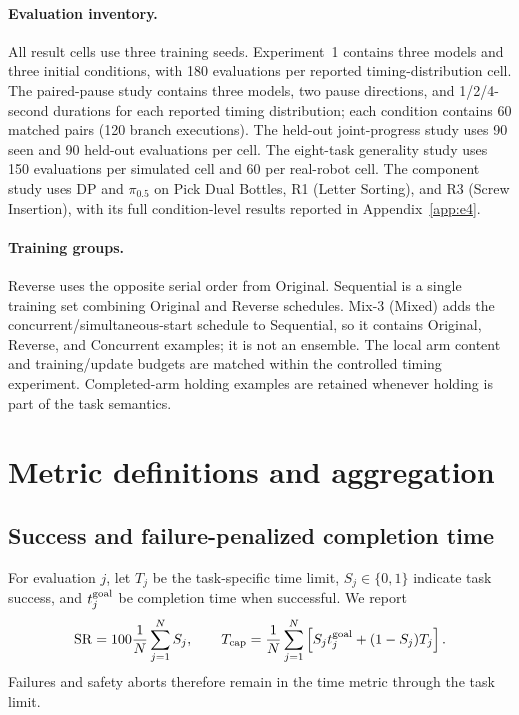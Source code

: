 \paragraph{Evaluation inventory.}
All result cells use three training seeds. Experiment~1 contains three models and three initial conditions, with 180 evaluations per reported timing-distribution cell. The paired-pause study contains three models, two pause directions, and 1/2/4-second durations for each reported timing distribution; each condition contains 60 matched pairs (120 branch executions). The held-out joint-progress study uses 90 seen and 90 held-out evaluations per cell. The eight-task generality study uses 150 evaluations per simulated cell and 60 per real-robot cell. The component study uses DP and $\pi_{0.5}$ on Pick Dual Bottles, R1 (Letter Sorting), and R3 (Screw Insertion), with its full condition-level results reported in Appendix~\ref{app:e4}.

\paragraph{Training groups.}
Reverse uses the opposite serial order from Original. Sequential is a single training set combining Original and Reverse schedules. Mix-3 (Mixed) adds the concurrent/simultaneous-start schedule to Sequential, so it contains Original, Reverse, and Concurrent examples; it is not an ensemble. The local arm content and training/update budgets are matched within the controlled timing experiment. Completed-arm holding examples are retained whenever holding is part of the task semantics.

\section{Metric definitions and aggregation}
\label{app:metrics}

\subsection{Success and failure-penalized completion time}
For evaluation $j$, let $T_j$ be the task-specific time limit, $S_j\in\{0,1\}$ indicate task success, and $t_j^{\rm goal}$ be completion time when successful. We report
\begin{equation}
 \mathrm{SR}=100\frac{1}{N}\sum_{j=1}^{N} S_j,
 \qquad
 T_{\rm cap}=\frac{1}{N}\sum_{j=1}^{N}
 \left[S_jt_j^{\rm goal}+(1-S_j)T_j\right].
 \label{eq:metrics-success}
\end{equation}
Failures and safety aborts therefore remain in the time metric through the task limit.

